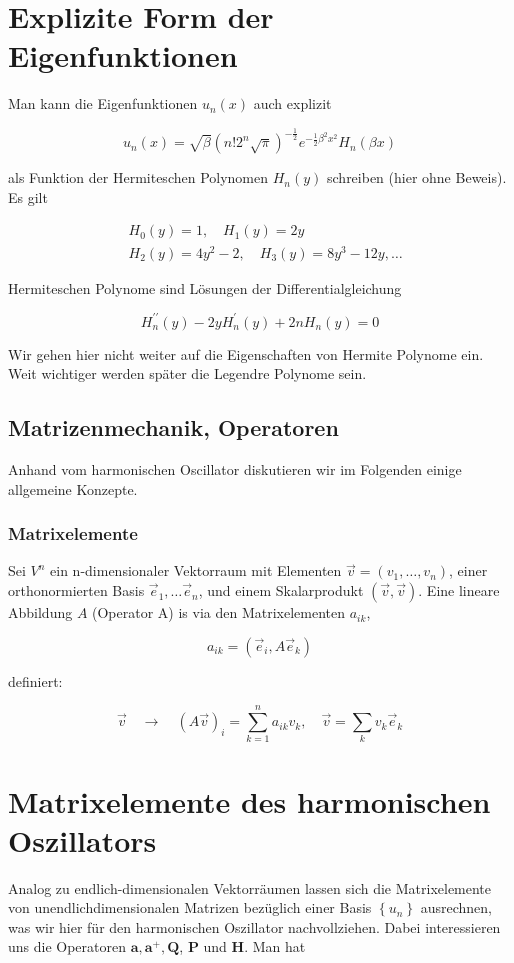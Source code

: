 \documentclass[10pt, letterpaper]{article}
\begin{document}
\section*{Explizite Form der Eigenfunktionen}
Man kann die Eigenfunktionen $u_{n}(x)$ auch explizit

$$
u_{n}(x)=\sqrt{\beta}\left(n!2^{n} \sqrt{\pi}\right)^{-\frac{1}{2}} e^{-\frac{1}{2} \beta^{2} x^{2}} H_{n}(\beta x)
$$

als Funktion der Hermiteschen Polynomen $H_{n}(y)$ schreiben (hier ohne Beweis). Es gilt

$$
\begin{aligned}
& H_{0}(y)=1, \quad H_{1}(y)=2 y \\
& H_{2}(y)=4 y^{2}-2, \quad H_{3}(y)=8 y^{3}-12 y, \ldots
\end{aligned}
$$

Hermiteschen Polynome sind Lösungen der Differentialgleichung

$$
H_{n}^{\prime \prime}(y)-2 y H_{n}^{\prime}(y)+2 n H_{n}(y)=0
$$

Wir gehen hier nicht weiter auf die Eigenschaften von Hermite Polynome ein. Weit wichtiger werden später die Legendre Polynome sein.

\subsection*{Matrizenmechanik, Operatoren}
Anhand vom harmonischen Oscillator diskutieren wir im Folgenden einige allgemeine Konzepte.

\subsubsection*{Matrixelemente}
Sei $V^{n}$ ein n-dimensionaler Vektorraum mit Elementen $\vec{v}=\left(v_{1}, \ldots, v_{n}\right)$, einer orthonormierten Basis $\vec{e}_{1}, \ldots \vec{e}_{n}$, und einem Skalarprodukt $(\vec{v}, \vec{v})$. Eine lineare Abbildung $A$ (Operator A) is via den Matrixelementen $a_{i k}$,

$$
a_{i k}=\left(\vec{e}_{i}, A \vec{e}_{k}\right)
$$

definiert:

$$
\vec{v} \quad \rightarrow \quad(A \vec{v})_{i}=\sum_{k=1}^{n} a_{i k} v_{k}, \quad \vec{v}=\sum_{k} v_{k} \vec{e}_{k}
$$

\section*{Matrixelemente des harmonischen Oszillators}
Analog zu endlich-dimensionalen Vektorräumen lassen sich die Matrixelemente von unendlichdimensionalen Matrizen bezüglich einer Basis $\left\{u_{n}\right\}$ ausrechnen, was wir hier für den harmonischen Oszillator nachvollziehen. Dabei interessieren uns die Operatoren $\mathbf{a}, \mathbf{a}^{+}, \mathbf{Q}$, $\mathbf{P}$ und $\mathbf{H}$. Man hat
\end{document}

